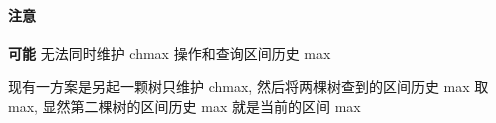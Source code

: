 \paragraph{注意} \textbf{可能} 无法同时维护 chmax 操作和查询区间历史 max

现有一方案是另起一颗树只维护 chmax, 然后将两棵树查到的区间历史 max 取 max, 显然第二棵树的区间历史 max 就是当前的区间 max
